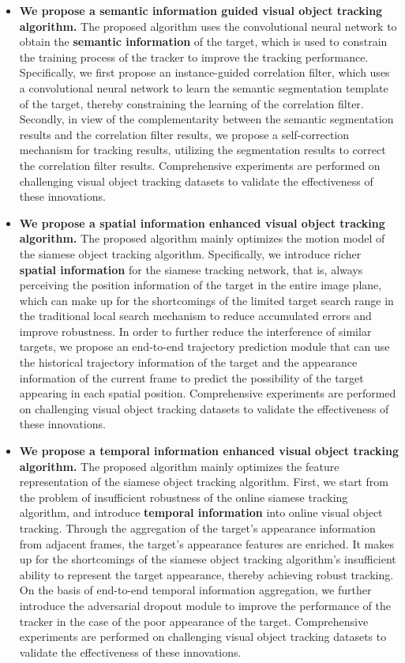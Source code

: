 \begin{itemize}
\item{\textbf{We propose a semantic information guided visual object tracking algorithm.} The proposed algorithm uses the convolutional neural network to obtain the \textbf{semantic information} of the target, which is used to constrain the training process of the tracker to improve the tracking performance. Specifically, we first propose an instance-guided correlation filter, which uses a convolutional neural network to learn the semantic segmentation template of the target, thereby constraining the learning of the correlation filter. Secondly, in view of the complementarity between the semantic segmentation results and the correlation filter results, we propose a self-correction mechanism for tracking results, utilizing the segmentation results to correct the correlation filter results. Comprehensive experiments are performed on challenging visual object tracking datasets to validate the effectiveness of these innovations.}

\item{\textbf{We propose a spatial information enhanced visual object tracking algorithm.} The proposed algorithm mainly optimizes the motion model of the siamese object tracking algorithm. Specifically, we introduce richer \textbf{spatial information} for the siamese tracking network, that is, always perceiving the position information of the target in the entire image plane, which can make up for the shortcomings of the limited target search range in the traditional local search mechanism to reduce accumulated errors and improve robustness. In order to further reduce the interference of similar targets, we propose an end-to-end trajectory prediction module that can use the historical trajectory information of the target and the appearance information of the current frame to predict the possibility of the target appearing in each spatial position. Comprehensive experiments are performed on challenging visual object tracking datasets to validate the effectiveness of these innovations.}

\item{\textbf{We propose a temporal information enhanced visual object tracking algorithm.} The proposed algorithm mainly optimizes the feature representation of the siamese object tracking algorithm. First, we start from the problem of insufficient robustness of the online siamese tracking algorithm, and introduce \textbf{temporal information} into online visual object tracking. Through the aggregation of the target's appearance information from adjacent frames, the target's appearance features are enriched. It makes up for the shortcomings of the siamese object tracking algorithm's insufficient ability to represent the target appearance, thereby achieving robust tracking. On the basis of end-to-end temporal information aggregation, we further introduce the adversarial dropout module to improve the performance of the tracker in the case of the poor appearance of the target. Comprehensive experiments are performed on challenging visual object tracking datasets to validate the effectiveness of these innovations.}


\end{itemize}
